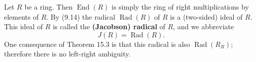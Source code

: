 Let $R$ be a ring. Then $\operatorname{End}(R)$ is simply the ring of right multiplications by elements of $R$. By (9.14) the radical $\operatorname{Rad}(R)$ of $R$ is a (two-sided) ideal of $R$. This ideal of $R$ is called the \textbf{(Jacobson) radical} of $R$, and we abbreviate
$$J(R) = \operatorname{Rad}(R).$$
One consequence of Theorem 15.3 is that this radical is also $\operatorname{Rad}(R_R)$; therefore there is no left-right ambiguity.
